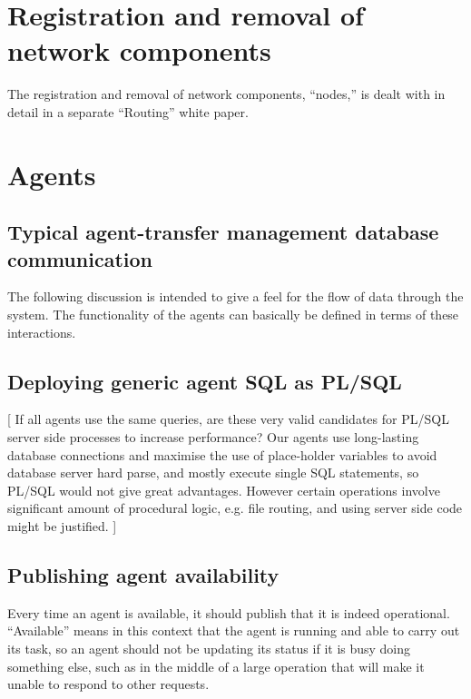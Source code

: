 \documentclass{cmspaper}
\begin{document}
\section{Registration and removal of network components}

The registration and removal of network components, ``nodes,'' is dealt with in detail in a separate ``Routing'' white paper.

\section{Agents}

\subsection{Typical agent-transfer management database communication}

The following discussion is intended to give a feel for the flow of data through the system. The functionality of the agents can basically be defined in terms of these interactions.

\subsection{Deploying generic agent SQL as PL/SQL}

[ If all agents use the same queries, are these very valid candidates for PL/SQL server side processes to increase performance?  Our agents use long-lasting database connections and maximise the use of place-holder variables to avoid database server hard parse, and mostly execute single SQL statements, so PL/SQL would not give great advantages.  However certain operations involve significant amount of procedural logic, e.g. file routing, and using server side code might be justified. ]

\subsection{Publishing agent availability}

Every time an agent is available, it should publish that it is indeed operational.  ``Available'' means in this context that the agent is running and able to carry out its task, so an agent should not be updating its status if it is busy doing something else, such as in the middle of a large operation that will make it unable to respond to other requests.
\end{document}
